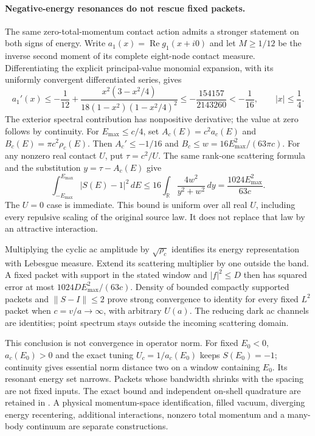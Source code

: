 \paragraph{Negative-energy resonances do not rescue fixed packets.}
The same zero-total-momentum contact action admits a stronger statement on
both signs of energy. Write $a_1(x)=\operatorname{Re}g_1(x+i0)$ and let
$M\geq1/12$ be the inverse second moment of its complete eight-node contact
measure. Differentiating the explicit principal-value monomial expansion,
with its uniformly convergent differentiated series, gives
\[
 a_1'(x)\leq-\frac1{12}
 +\frac{x^2(3-x^2/4)}{18(1-x^2)(1-x^2/4)^2}
 \leq-\frac{154157}{2143260}<-\frac1{16},
 \qquad |x|\leq\frac14.
\]
The exterior spectral contribution has nonpositive derivative; the value
at zero follows by continuity. For $E_{\max}\leq c/4$, set
$A_c(E)=c^2a_c(E)$ and $B_c(E)=\pi c^2\rho_c(E)$. Then
$A_c'\leq-1/16$ and $B_c\leq w=16E_{\max}^2/(63\pi c)$.
For any nonzero real contact $U$, put $\tau=c^2/U$. The same rank-one
scattering formula and the substitution $y=\tau-A_c(E)$ give
\[
 \int_{-E_{\max}}^{E_{\max}}|S(E)-1|^2\,dE
 \leq 16\int_{\mathbb R}\frac{4w^2}{y^2+w^2}\,dy
 =\frac{1024E_{\max}^2}{63c}.
\]
The $U=0$ case is immediate. This bound is uniform over all real $U$,
including every repulsive scaling of the original source law. It does not
replace that law by an attractive interaction.

Multiplying the cyclic ac amplitude by $\sqrt{\rho_c}$ identifies its
energy representation with Lebesgue measure. Extend its scattering
multiplier by one outside the band. A fixed packet with support in the
stated window and $|f|^2\leq D$ then has squared error at most
$1024D E_{\max}^2/(63c)$. Density of bounded compactly supported packets
and $\|S-I\|\leq2$ prove strong convergence to identity for every fixed
$L^2$ packet when $c=v/a\to\infty$, with arbitrary $U(a)$.
The reducing dark ac channels are identities; point spectrum stays
outside the incoming scattering domain.

This conclusion is not convergence in operator norm. For fixed $E_0<0$,
$a_c(E_0)>0$ and the exact tuning $U_c=1/a_c(E_0)$ keeps $S(E_0)=-1$;
continuity gives essential norm distance two on a window containing $E_0$.
Its resonant energy set narrows. Packets whose bandwidth shrinks with the
spacing are not fixed inputs. The exact bound and independent on-shell
quadrature are retained in .
A physical momentum-space identification, filled vacuum, diverging energy
recentering, additional interactions, nonzero total momentum and a
many-body continuum are separate constructions.
